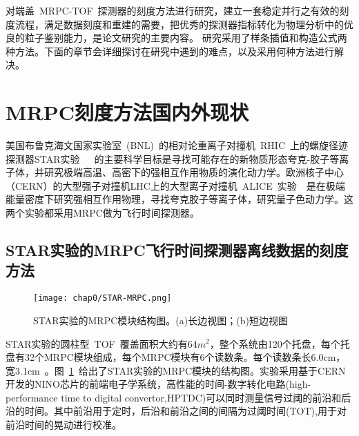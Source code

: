 对端盖~MRPC-TOF~探测器的刻度方法进行研究，建立一套稳定并行之有效的刻度流程，满足数据刻度和重建的需要，把优秀的探测器指标转化为物理分析中的优良的粒子鉴别能力，是论文研究的主要内容。
研究采用了样条插值和构造公式两种方法。下面的章节会详细探讨在研究中遇到的难点，以及采用何种方法进行解决。

\section{MRPC刻度方法国内外现状}

美国布鲁克海文国家实验室~(BNL)~的相对论重离子对撞机~RHIC~上的螺旋径迹探测器STAR实验~\cite{ruanlj:2005}~\cite{wuj:2005}~\cite{wangy:2010}的主要科学目标是寻找可能存在的新物质形态夸克-胶子等离子体，并研究极端高温、高密下的强相互作用物质的演化动力学。欧洲核子中心（CERN）的大型强子对撞机LHC上的大型离子对撞机~ALICE~实验~\cite{A.Alici:2012}~\cite{A.Alici:2014}是在极端能量密度下研究强相互作用物理，寻找夸克胶子等离子体，研究量子色动力学。这两个实验都采用MRPC做为飞行时间探测器。

\begin{comment}
~STAR~的~TOF~由~3840~块~MRPC~组成，每块有~6~个读数条。刻度样本选择的是动量在~0.3—0.6Gev/c~的~$\pi$~介子。由于信号在读出条内的反射，每个电子学读出通道的~TOT~（time-over-threshold~\cite{Shao:2009aa}，简称TOT）分布存在多峰，且各不相同，时幅修正的刻度采用样条拟合（spline-fit）的方法。信号在读出条上的传输时间依赖信号传播距离，击中位置的修正只考虑沿读出条方向的效应。扣除起始时间晃动~55~ps后，时间分辨为~75~ps~\cite{Shao:2009aa}。

~ALICE~的~TOF~由~1593~块~MRPC~组成，每块面积为~7.4~cm$\times$~120~cm，每个模块~96~个读出端，每个读出端面积为~2.5~cm$\times$~3.5~cm。刻度样本需要完整的径迹重建。~TOF~刻度分为三个步骤：（1）一个整体的偏移；（2）每个电子学通道的偏移；（3）每个电子学通道的时幅修正。时幅修正采用的是~TOT~的~5~阶多项式拟合。扣除事例起始时间的影响后，时间分辨为~80~ps~\cite{A.A:2005}。
\end{comment}

\subsection{STAR实验的MRPC飞行时间探测器离线数据的刻度方法}
\begin{figure}[!h]
  \centering
  \texttt{[image: chap0/STAR-MRPC.png]}
  \caption{STAR实验的MRPC模块结构图。(a)长边视图；(b)短边视图}
  \label{fig:STAR-MRPC}
\end{figure}

STAR实验的圆柱型~TOF~覆盖面积大约有64$m^{2}$，整个系统由120个托盘，每个托盘有32个MRPC模块组成，每个MRPC模块有6个读数条。每个读数条长6.0cm，宽3.1cm~\cite{wangy:2010}。图~\ref{fig:STAR-MRPC}~给出了STAR实验的MRPC模块的结构图。实验采用基于CERN开发的NINO芯片的前端电子学系统，高性能的时间-数字转化电路(high-performance time to digital convertor,HPTDC)可以同时测量信号过阈的前沿和后沿的时间。其中前沿用于定时，后沿和前沿之间的间隔为过阈时间(TOT),用于对前沿时间的晃动进行校准。

